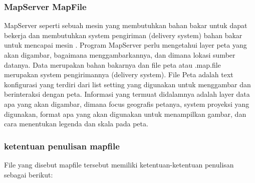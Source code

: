 	\subsubsection {MapServer MapFile}		MapServer seperti sebuah mesin yang membutuhkan bahan bakar untuk dapat bekerja dan membutuhkan system pengiriman (delivery system) bahan bakar untuk mencapai mesin . 
		Program MapServer perlu mengetahui layer peta yang akan digambar, bagaimana menggambarkannya, dan dimana lokasi sumber datanya. 
		Data merupakan bahan bakarnya dan file peta atau .map.file merupakan system pengirimannya (delivery system). 
		File Peta adalah text konfigurasi yang terdiri dari list setting yang digunakan untuk menggambar dan berinteraksi dengan peta. 
		Informasi yang termuat didalamnya adalah layer data apa yang akan digambar, dimana focus geografis petanya, system proyeksi yang digunakan, 
		format apa yang akan digunakan untuk menampilkan gambar, dan cara menentukan legenda dan skala pada peta.
		
	\subsubsection{ketentuan penulisan mapfile}
		File yang disebut mapfile tersebut memiliki ketentuan-ketentuan penulisan sebagai berikut:

